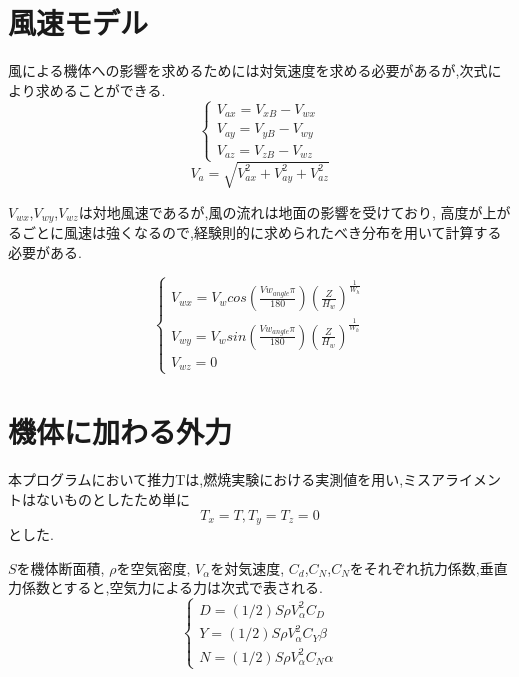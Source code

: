 \documentclass[a4paper]{jarticle}
\begin{document}
\section{風速モデル}
風による機体への影響を求めるためには対気速度を求める必要があるが,次式により求めることができる.
\begin{equation}
  \begin{cases}
    V_{ax} = V_{xB} - V_{wx} \\
    V_{ay} = V_{yB} - V_{wy} \\
    V_{az} = V_{zB} - V_{wz}
  \end{cases}
\end{equation}
\begin{equation}
  V_{a} = \sqrt{V_{ax}^2+V_{ay}^2+V_{az}^2}
\end{equation}

\(V_{wx}\),\(V_{wy}\),\(V_{wz}\)は対地風速であるが,風の流れは地面の影響を受けており,
高度が上がるごとに風速は強くなるので,経験則的に求められたべき分布を用いて計算する必要がある.

\begin{equation}
  \begin{cases}
    V_{wx} = V_w cos (\frac{Vw_{angle} \pi}{180} )(\frac{Z}{H_w})^\frac{1}{W_h} \\
    V_{wy} = V_w sin (\frac{Vw_{angle} \pi}{180} )(\frac{Z}{H_w})^\frac{1}{W_h} \\
    V_{wz} = 0
  \end{cases}
\end{equation}

\section{機体に加わる外力}

本プログラムにおいて推力Tは,燃焼実験における実測値を用い,ミスアライメントはないものとしたため単に
\begin{equation}
  T_x = T, T_y = T_z = 0
\end{equation}
とした.

\(S\)を機体断面積, \(\rho\)を空気密度, \(V_{\alpha}\)を対気速度, \(C_d\),\(C_N\),\(C_N\)をそれぞれ抗力係数,垂直力係数とすると,空気力による力は次式で表される.
\begin{equation}
  \begin{cases}
    D = (1/2)S \rho V_{\alpha}^2 C_D \\
    Y = (1/2)S \rho V_{\alpha}^2 C_Y \beta \\
    N = (1/2)S \rho V_{\alpha}^2 C_N \alpha
  \end{cases}
\end{equation}
\end{document}
